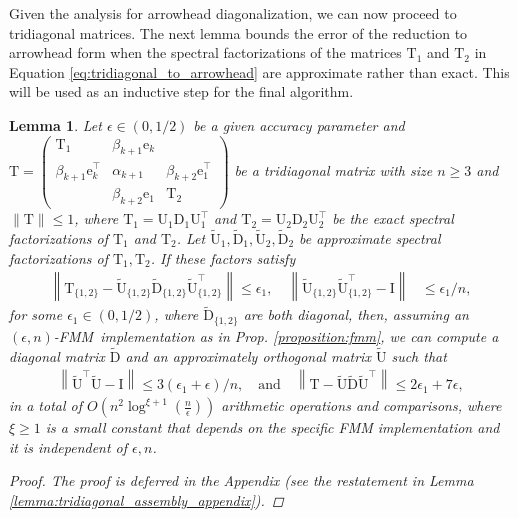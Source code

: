 \documentclass{article}
\newcommand{\lnorm}{\left\|}
\newcommand{\rnorm}{\right\|}
\newcommand{\lpar}{\left(}
\newcommand{\rpar}{\right)}
\newtheorem{lemma}{Lemma}[section]
\newcommand\vece{\boldsymbol{\mathrm{e}}}
\newcommand\matD{\boldsymbol{\mathrm{D}}}
\newcommand\matI{\boldsymbol{\mathrm{I}}}
\newcommand\matT{\boldsymbol{\mathrm{T}}}
\newcommand\matU{\boldsymbol{\mathrm{U}}}
\newcommand\matDtilde{\widetilde{\boldsymbol{\mathrm{D}}}}
\newcommand\matUtilde{\widetilde{\boldsymbol{\mathrm{U}}}}
\newcommand{\cfmm}{\xi}
\newcommand{\fmmalgo}{FMM} \usepackage[utf8]{inputenc}
\begin{document}
Given the analysis for arrowhead diagonalization, we can now proceed to tridiagonal matrices.
The next lemma bounds the error of the reduction to arrowhead form when the spectral factorizations of the matrices $\matT_1$ and $\matT_2$ in Equation \eqref{eq:tridiagonal_to_arrowhead} are approximate rather than exact. This will be used as an inductive step for the final algorithm.
\begin{lemma}
\label{lemma:tridiagonal_assembly}
Let $\epsilon\in(0,1/2)$ be a given accuracy parameter and $\matT = \begin{pmatrix}
    \matT_1 & \beta_{k+1}\vece_k & \\
    \beta_{k+1}\vece_k^\top & \alpha_{k+1} & \beta_{k+2}\vece_1^\top \\
     & \beta_{k+2}\vece_1 & \matT_2
\end{pmatrix}$ be a tridiagonal matrix with size  $n\geq 3$ and $\|\matT\|\leq 1$, where $\matT_1=\matU_1\matD_1\matU_1^\top$ and $\matT_2=\matU_2\matD_2\matU_2^\top$ be the exact spectral factorizations of $\matT_1$ and $\matT_2$. Let $\matUtilde_1,\matDtilde_1,\matUtilde_2,\matDtilde_2$ be approximate spectral factorizations of $\matT_1,\matT_2$. If these factors satisfy
    \begin{align*}
        \lnorm
            \matT_{\{1,2\}} - \matUtilde_{\{1,2\}}\matDtilde_{\{1,2\}}\matUtilde_{\{1,2\}}^\top
        \rnorm 
        \leq \epsilon_1,
        \quad
        \lnorm \matUtilde_{\{1,2\}}\matUtilde_{\{1,2\}}^\top -\matI \rnorm &\leq \epsilon_1/n,
    \end{align*}
    for some $\epsilon_1\in(0,1/2)$, where $\matDtilde_{\{1,2\}}$ are both diagonal, then, assuming an $(\epsilon,n)$-\fmmalgo\   implementation as in Prop. \ref{proposition:fmm}, we can compute a diagonal matrix $\matDtilde$ and an approximately orthogonal matrix $\matUtilde$ such that
    \begin{align*}
        \lnorm\matUtilde^\top\matUtilde-\matI\rnorm\leq 3(\epsilon_1+\epsilon)/n,
        \quad \text{and} \quad
        \lnorm 
            \matT-\matUtilde\matDtilde\matUtilde^\top
        \rnorm \leq 2\epsilon_1+7\epsilon,
    \end{align*}
    in a total of $O\lpar n^2\log^{\cfmm+1}(\tfrac{n}{\epsilon})\rpar$ arithmetic operations and comparisons, where $\xi\geq 1$ is a small constant that depends on the specific FMM implementation and it is independent of $\epsilon,n$.
    \begin{proof}
        The proof is deferred in the Appendix (see the restatement in Lemma \ref{lemma:tridiagonal_assembly_appendix}).
    \end{proof}
\end{lemma}
\end{document}
